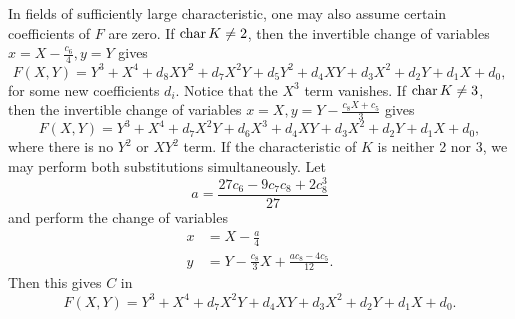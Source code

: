 In fields of sufficiently large characteristic,
one may also assume certain coefficients of $F$ are zero.
If $\operatorname{char} K \neq 2$, then the invertible change of variables $x = X - \frac {c_6} 4, y = Y$ gives
\begin{equation}
  \label{eq_c34_char_not_2}
  F(X,Y) = Y^3 + X^4 + d_8XY^2 + d_7X^2Y + d_5Y^2 + d_4XY + d_3X^2 + d_2Y + d_1X + d_0,
\end{equation}
for some new coefficients $d_i$.
Notice that the $X^3$ term vanishes.
If $\operatorname{char} K \neq 3$, then the invertible change of variables $x = X, y = Y - \frac{c_8X + c_5}{3}$ gives
\begin{equation}
  \label{eq_c34_char_not_3}
  F(X,Y) = Y^3 + X^4 + d_7X^2Y + d_6X^3 + d_4XY + d_3X^2 + d_2Y + d_1X + d_0,
\end{equation}
where there is no $Y^2$ or $XY^2$ term.
If the characteristic of $K$ is neither 2 nor 3, we may perform both substitutions simultaneously. Let
\[ a = \frac {27c_6 - 9c_7c_8 + 2c_8^3} {27} \]
and perform the change of variables
\begin{align*}
  x &= X - \frac a 4 \\
  y &= Y - \frac {c_8} {3} X + \frac {ac_8 - 4c_5} {12}.
\end{align*}
Then this gives $C$ in 
\begin{equation}
  \label{eq_c34_short}
  F(X,Y) = Y^3 + X^4 + d_7X^2Y + d_4XY + d_3X^2 + d_2Y + d_1X + d_0.
\end{equation}

